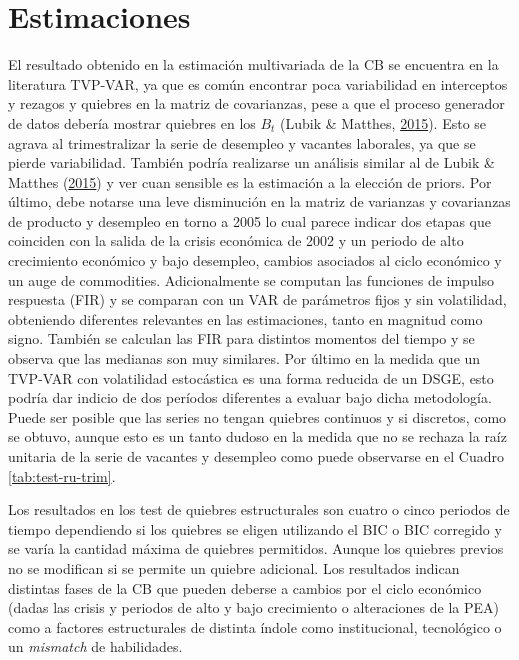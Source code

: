 \documentclass[12pt,oneside]{reedthesis}
\begin{document}
\hypertarget{estimaciones}{%
\section{Estimaciones}\label{estimaciones}}

El resultado obtenido en la estimación multivariada de la CB se encuentra en la literatura TVP-VAR, ya que es común encontrar poca variabilidad en interceptos y rezagos y quiebres en la matriz de covarianzas, pese a que el proceso generador de datos debería mostrar quiebres en los \(B_t\) (Lubik \& Matthes, \protect\hyperlink{ref-Lubik2016b}{2015}). Esto se agrava al trimestralizar la serie de desempleo y vacantes laborales, ya que se pierde variabilidad. También podría realizarse un análisis similar al de Lubik \& Matthes (\protect\hyperlink{ref-Lubik2016b}{2015}) y ver cuan sensible es la estimación a la elección de priors. Por último, debe notarse una leve disminución en la matriz de varianzas y covarianzas de producto y desempleo en torno a 2005 lo cual parece indicar dos etapas que coinciden con la salida de la crisis económica de 2002 y un periodo de alto crecimiento económico y bajo desempleo, cambios asociados al ciclo económico y un auge de commodities. Adicionalmente se computan las funciones de impulso respuesta (FIR) y se comparan con un VAR de parámetros fijos y sin volatilidad, obteniendo diferentes relevantes en las estimaciones, tanto en magnitud como signo. También se calculan las FIR para distintos momentos del tiempo y se observa que las medianas son muy similares. Por último en la medida que un TVP-VAR con volatilidad estocástica es una forma reducida de un DSGE, esto podría dar indicio de dos períodos diferentes a evaluar bajo dicha metodología. Puede ser posible que las series no tengan quiebres continuos y si discretos, como se obtuvo, aunque esto es un tanto dudoso en la medida que no se rechaza la raíz unitaria de la serie de vacantes y desempleo como puede observarse en el Cuadro \ref{tab:test-ru-trim}.

Los resultados en los test de quiebres estructurales son cuatro o cinco periodos de tiempo dependiendo si los quiebres se eligen utilizando el BIC o BIC corregido y se varía la cantidad máxima de quiebres permitidos. Aunque los quiebres previos no se modifican si se permite un quiebre adicional. Los resultados indican distintas fases de la CB que pueden deberse a cambios por el ciclo económico (dadas las crisis y periodos de alto y bajo crecimiento o alteraciones de la PEA) como a factores estructurales de distinta índole como institucional, tecnológico o un \emph{mismatch} de habilidades.
\end{document}
